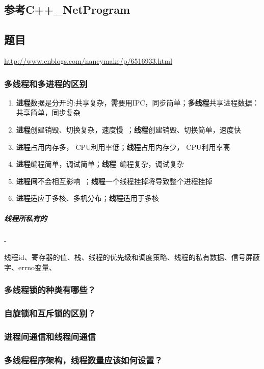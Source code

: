 \documentclass[UTF8,a4paper,8pt]{ctexart}
\begin{document}
	\subsection{参考C++\_NetProgram}
	
	\subsection{题目}
		\url{http://www.cnblogs.com/nancymake/p/6516933.html}
		
		\subsubsection{多线程和多进程的区别}
			\begin{enumerate}
				\item \textbf{进程}数据是分开的:共享复杂，需要用IPC，同步简单；\textbf{多线程}共享进程数据：共享简单，同步复杂
				\item \textbf{进程}创建销毁、切换复杂，速度慢 ；\textbf{线程}创建销毁、切换简单，速度快 
				\item \textbf{进程}占用内存多， CPU利用率低；\textbf{线程}占用内存少， CPU利用率高
				\item \textbf{进程}编程简单，调试简单；\textbf{线程} 编程复杂，调试复杂
				\item \textbf{进程间}不会相互影响 ；\textbf{线程}一个线程挂掉将导致整个进程挂掉
				\item \textbf{进程}适应于多核、多机分布；\textbf{线程}适用于多核
			\end{enumerate}
		
			\subparagraph{线程所私有的}-
			
			线程id、寄存器的值、栈、线程的优先级和调度策略、线程的私有数据、信号屏蔽字、errno变量、
		\subsubsection{多线程锁的种类有哪些？}
		
		\subsubsection{自旋锁和互斥锁的区别？}
		
		\subsubsection{进程间通信和线程间通信}
		
		\subsubsection{多线程程序架构，线程数量应该如何设置？}
		
\end{document}
